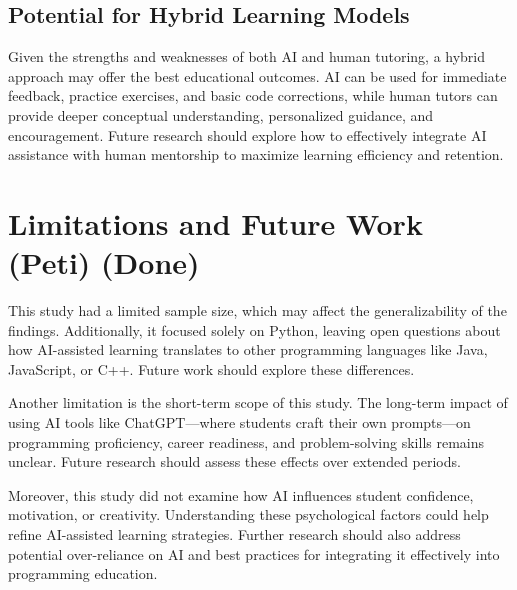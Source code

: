 \documentclass[12pt]{article}  %
\begin{document}
\subsection{Potential for Hybrid Learning Models}
Given the strengths and weaknesses of both AI and human tutoring, a hybrid approach may offer the best educational outcomes. AI can be used for immediate feedback, practice exercises, and basic code corrections, while human tutors can provide deeper conceptual understanding, personalized guidance, and encouragement. Future research should explore how to effectively integrate AI assistance with human mentorship to maximize learning efficiency and retention.



\section{Limitations and Future Work (Peti) (Done)}

This study had a limited sample size, which may affect the generalizability of the findings. Additionally, it focused solely on Python, leaving open questions about how AI-assisted learning translates to other programming languages like Java, JavaScript, or C++. Future work should explore these differences.

Another limitation is the short-term scope of this study. The long-term impact of using AI tools like ChatGPT—where students craft their own prompts—on programming proficiency, career readiness, and problem-solving skills remains unclear. Future research should assess these effects over extended periods.

Moreover, this study did not examine how AI influences student confidence, motivation, or creativity. Understanding these psychological factors could help refine AI-assisted learning strategies. Further research should also address potential over-reliance on AI and best practices for integrating it effectively into programming education.
\end{document}
